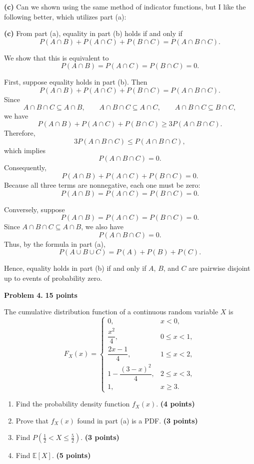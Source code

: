 \documentclass[11pt]{article}
\begin{document}
\begin{solutionbox}
\textbf{(c)} Can we shown using the same method of indicator functions, but I like the following better, which utilizes part (a):


\textbf{(c)} From part (a), equality in part (b) holds if and only if
\[
P(A\cap B)+P(A\cap C)+P(B\cap C)
=
P(A\cap B\cap C).
\]

We show that this is equivalent to
\[
P(A\cap B)=P(A\cap C)=P(B\cap C)=0.
\]

First, suppose equality holds in part (b). Then
\[
P(A\cap B)+P(A\cap C)+P(B\cap C)
=
P(A\cap B\cap C).
\]
Since
\[
A\cap B\cap C\subseteq A\cap B,\qquad
A\cap B\cap C\subseteq A\cap C,\qquad
A\cap B\cap C\subseteq B\cap C,
\]
we have
\[
P(A\cap B)+P(A\cap C)+P(B\cap C)
\geq 3P(A\cap B\cap C).
\]
Therefore,
\[
3P(A\cap B\cap C)
\leq P(A\cap B\cap C),
\]
which implies
\[
P(A\cap B\cap C)=0.
\]
Consequently,
\[
P(A\cap B)+P(A\cap C)+P(B\cap C)=0.
\]
Because all three terms are nonnegative, each one must be zero:
\[
P(A\cap B)=P(A\cap C)=P(B\cap C)=0.
\]

Conversely, suppose
\[
P(A\cap B)=P(A\cap C)=P(B\cap C)=0.
\]
Since \(A\cap B\cap C\subseteq A\cap B\), we also have
\[
P(A\cap B\cap C)=0.
\]
Thus, by the formula in part (a),
\[
P(A\cup B\cup C)=P(A)+P(B)+P(C).
\]

Hence, equality holds in part (b) if and only if \(A\), \(B\), and \(C\)
are pairwise disjoint up to events of probability zero.

\end{solutionbox}







\newpage
\begin{problemheader}
\textbf{Problem 4.} \hfill \textbf{15 points}
\end{problemheader}

The cumulative distribution function of a continuous random variable $X$ is
\[
F_X(x)=
\begin{cases}
0, & x<0,\\[1mm]
\dfrac{x^2}{4}, & 0\leq x<1,\\[2mm]
\dfrac{2x-1}{4}, & 1\leq x<2,\\[2mm]
1-\dfrac{(3-x)^2}{4}, & 2\leq x<3,\\[2mm]
1, & x\geq 3.
\end{cases}
\]

\begin{enumerate}[label=(\alph*),leftmargin=*,itemsep=0.75em]
    \item Find the probability density function $f_X(x)$. 
    \hfill \textbf{(4 points)}
    
    \item Prove that $f_X(x)$ found in part (a) is a PDF. 
    \hfill \textbf{(3 points)}
    
    \item Find $P\!\left(\frac12<X\leq\frac52\right)$. 
    \hfill \textbf{(3 points)}
    
    \item Find $\mathbb{E}[X]$. 
    \hfill \textbf{(5 points)}
\end{enumerate}
\end{document}

